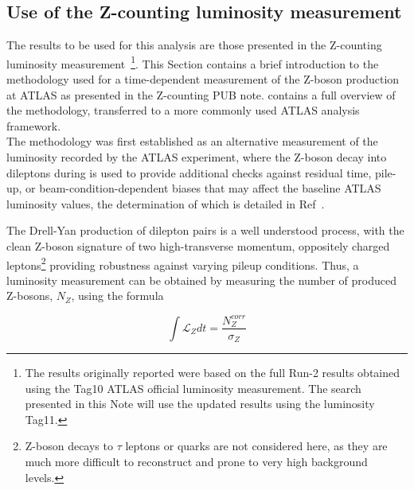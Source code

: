 



\subsection{Use of the Z-counting luminosity measurement}

The results to be used for this analysis are those presented in the Z-counting luminosity measurement~\cite{ATL-DAPR-PUB-2021-001}\footnote{The results originally reported were based on the full Run-2 results obtained using the Tag10 ATLAS official luminosity measurement. The search presented in this Note will use the updated results using the luminosity Tag11.}. This Section contains a brief introduction to the methodology used for a time-dependent measurement of the Z-boson production at ATLAS as presented in the Z-counting PUB note. \color{black} contains a full overview of the methodology, transferred to a more commonly used ATLAS analysis framework.\\

The methodology was first established as an alternative measurement of the luminosity recorded by the ATLAS experiment, where the Z-boson decay into dileptons during \color{red}{physics running}\color{black} is used to provide additional checks against residual time, pile-up, or beam-condition-dependent biases that may affect the baseline ATLAS luminosity values, the determination of which is detailed in Ref~\cite{ATLAS-CONF-2019-021}.

The Drell-Yan production of dilepton pairs is a well understood process, with the clean Z-boson signature of two high-transverse momentum, oppositely charged leptons\footnote{Z-boson decays to $\tau$ leptons or quarks are not considered here, as they are much more difficult to reconstruct and prone to very high background levels.} providing robustness against varying pileup conditions. Thus, a luminosity measurement can be obtained by measuring the number of produced Z-bosons, $N_Z$, using the formula

\begin{equation}
\int \mathcal{L}_Z dt = \frac{N_Z^{corr}}{\sigma_Z}
\label{eq:Zcount:RawLumi}
\end{equation}

